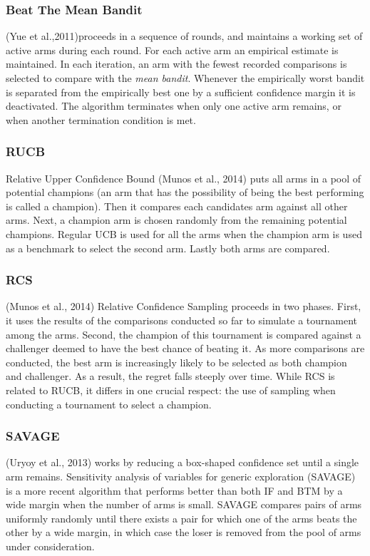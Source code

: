 \documentclass{llncs}
\begin{document}
\subsubsection{Beat The Mean Bandit}
	(Yue et al.,2011)proceeds in a sequence of rounds,
	and maintains a working set of active arms during each round. 
	For each active arm an empirical estimate is maintained.
	In each iteration, an arm with the fewest recorded comparisons is selected to compare with the {\textit{mean bandit}}.
	Whenever the empirically worst bandit is separated from the empirically best one by a sufficient confidence margin it is deactivated.
	The algorithm terminates when only one active arm remains, or when another termination condition is met.
	


\subsubsection{RUCB} Relative Upper Confidence Bound
	(Munos et al., 2014) puts all arms in a pool of potential champions (an arm that has the possibility of being the best performing is called a champion).
	Then it compares each candidates arm against all other arms.
	Next, a champion arm is chosen randomly from the remaining potential champions.
	Regular UCB is used for all the arms when the champion arm is used as a benchmark to select the second arm. 
	Lastly both arms are compared.
	
\subsubsection{RCS}
	(Munos et al., 2014) Relative Confidence Sampling proceeds in two phases. 
	First, it uses the results of the comparisons conducted so far to simulate a tournament among the arms. 
	Second, the champion of this tournament is compared against a challenger deemed to have the best chance of beating it. 
	As more comparisons are conducted, the best arm is increasingly
likely to be selected as both champion and challenger. As a result, the regret falls steeply over time.
While RCS is related to RUCB, it differs in one crucial
respect: the use of sampling when conducting a tournament to select a champion.
	
\subsubsection{SAVAGE}
	(Uryoy et al., 2013) works by reducing a box-shaped confidence set until a single arm remains.
	Sensitivity analysis of variables for generic exploration (SAVAGE) is a more recent algorithm that performs better than both IF and BTM by a wide margin when the number of arms is small. 
SAVAGE compares pairs of arms uniformly randomly until
there exists a pair for which one of the arms beats the other by
a wide margin, in which case the loser is removed from the pool of arms under consideration.

\end{document}

